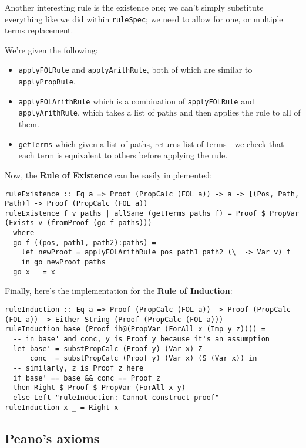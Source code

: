 \documentclass{article}
\begin{document}
Another interesting rule is the existence one; we can't simply substitute everything like we did within \texttt{ruleSpec}; we need to allow for one, or multiple terms replacement.

We're given the following:

\begin{itemize}
\item \texttt{applyFOLRule} and \texttt{applyArithRule}, both of which are similar to \texttt{applyPropRule}.
\item \texttt{applyFOLArithRule} which is a combination of \texttt{applyFOLRule} and \texttt{applyArithRule}, which takes a list of paths and then applies the rule to all of them.
\item \texttt{getTerms} which given a list of paths, returns list of terms - we check that each term is equivalent to others before applying the rule.
\end{itemize}

Now, the \textbf{Rule of Existence} can be easily implemented:

\begin{lstlisting}
ruleExistence :: Eq a => Proof (PropCalc (FOL a)) -> a -> [(Pos, Path, Path)] -> Proof (PropCalc (FOL a))
ruleExistence f v paths | allSame (getTerms paths f) = Proof $ PropVar (Exists v (fromProof (go f paths)))
  where
  go f ((pos, path1, path2):paths) =
    let newProof = applyFOLArithRule pos path1 path2 (\_ -> Var v) f
    in go newProof paths
  go x _ = x
\end{lstlisting}

Finally, here's the implementation for the \textbf{Rule of Induction}:

\begin{lstlisting}
ruleInduction :: Eq a => Proof (PropCalc (FOL a)) -> Proof (PropCalc (FOL a)) -> Either String (Proof (PropCalc (FOL a)))
ruleInduction base (Proof ih@(PropVar (ForAll x (Imp y z)))) =
  -- in base' and conc, y is Proof y because it's an assumption
  let base' = substPropCalc (Proof y) (Var x) Z
      conc  = substPropCalc (Proof y) (Var x) (S (Var x)) in
  -- similarly, z is Proof z here
  if base' == base && conc == Proof z
  then Right $ Proof $ PropVar (ForAll x y)
  else Left "ruleInduction: Cannot construct proof"
ruleInduction x _ = Right x
\end{lstlisting}

\subsection{Peano's axioms}
\end{document}
